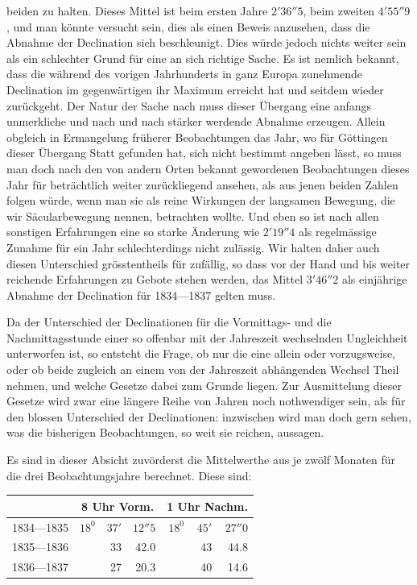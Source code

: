 beiden zu halten. Dieses Mittel ist beim ersten Jahre $2'36''5$, beim zweiten $4'55''9$, und man könnte versucht sein, dies als einen Beweis anzusehen, dass die Abnahme der Declination sich beschleunigt. Dies würde jedoch nichts weiter sein als ein schlechter Grund für eine an sich richtige Sache. Es ist nemlich bekannt, dass die während des vorigen Jahrhunderts in ganz Europa zunehmende Declination im gegenwärtigen ihr Maximum erreicht hat und seitdem wieder zurückgeht. Der Natur der Sache nach muss dieser Übergang eine anfangs unmerkliche und nach und nach stärker werdende Abnahme erzeugen. Allein obgleich in Ermangelung früherer Beobachtungen das Jahr, wo für Göttingen dieser Übergang Statt gefunden hat, sich nicht bestimmt angeben lässt, so muss man doch nach den von andern Orten bekannt gewordenen Beobachtungen dieses Jahr für beträchtlich weiter zurückliegend ansehen, als aus jenen beiden Zahlen folgen würde, wenn man sie als reine Wirkungen der langsamen Bewegung, die wir Säcularbewegung nennen, betrachten wollte. Und eben so ist nach allen sonstigen Erfahrungen eine so starke Änderung wie $2'19''4$ als regelmässige Zunahme für ein Jahr schlechterdings nicht zulässig. Wir halten daher auch diesen Unterschied grösstentheils für zufällig, so dass vor der Hand und bis weiter reichende Erfahrungen zu Gebote stehen werden, das Mittel $3'46''2$ als einjährige Abnahme der Declination für 1834---1837 gelten muss.

Da der Unterschied der Declinationen für die Vormittags- und die Nachmittagsstunde einer so offenbar mit der Jahreszeit wechselnden Ungleichheit unterworfen ist, so entsteht die Frage, ob nur die eine allein oder vorzugsweise, oder ob beide zugleich an einem von der Jahreszeit abhängenden Wechsel Theil nehmen, und welche Gesetze dabei zum Grunde liegen. Zur Ausmittelung dieser Gesetze wird zwar eine längere Reihe von Jahren noch nothwendiger sein, als für den blossen Unterschied der Declinationen: inzwischen wird man doch gern sehen, was die bisherigen Beobachtungen, so weit sie reichen, aussagen.

Es sind in dieser Absicht zuvörderst die Mittelwerthe aus je zwölf Monaten für die drei Beobachtungsjahre berechnet. Diese sind:
\begin{center}\small
\begin{tabular}{l|rrr|rrr}
&\multicolumn{3}{c|}{8 Uhr Vorm.}&\multicolumn{3}{c}{1 Uhr Nachm.}\\\hline
1834---1835&$18^0$&$37'$&$12''5$&$18^0$&$45'$&$27''0$\\
1835---1836&&33&42.0&&43&44.8\\
1836---1837&&27&20.3&&40&14.6
\end{tabular}
\end{center}

